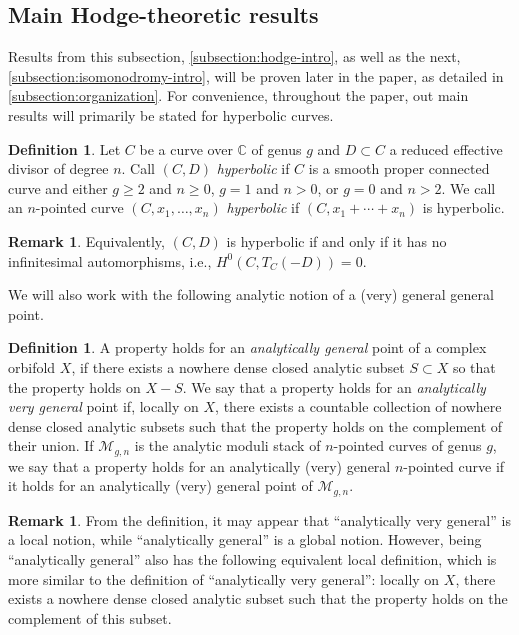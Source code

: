 \documentclass[12 pt]{amsart}
\theoremstyle{plain}
\theoremstyle{definition}
\newtheorem{definition}[subsubsection]{Definition}
\newtheorem{remark}[subsubsection]{Remark}
\theoremstyle{remark}
\numberwithin{equation}{section}
\begin{document}
\subsection{Main Hodge-theoretic results}
\label{subsection:hodge-intro}
Results from this subsection, \autoref{subsection:hodge-intro}, as well as the
next, \autoref{subsection:isomonodromy-intro}, will be proven later in the
paper, as detailed in \autoref{subsection:organization}.
For convenience, throughout the paper, out main results will primarily be stated for hyperbolic curves.
\begin{definition}
	\label{definition:hyperbolic}
	Let $C$ be a curve over $\mathbb C$ of genus $g$ and $D \subset C$ a
	reduced effective divisor of degree $n$. 
	Call $(C, D)$ {\em hyperbolic} if $C$ is a smooth proper connected curve
	and
	either $g \geq 2$ and $n\geq 0$, $g = 1$ and $n > 0$, or $g =0$ and $n > 2$.
	We call an $n$-pointed curve $(C, x_1, \ldots, x_n)$ {\em hyperbolic} if
	$(C, x_1 +\cdots + x_n)$ is hyperbolic.
\end{definition}
\begin{remark}
	\label{remark:}
	Equivalently, $(C,D)$ is hyperbolic if and only if it has no infinitesimal automorphisms,
i.e., $H^0(C, T_C(-D)) = 0$.
\end{remark}

We will also work with the following analytic notion of a (very) general general point.

\begin{definition}
	\label{definition:general}
	A property holds for an {\em analytically general} point of a complex orbifold $X$, 
	if there exists a nowhere dense
	closed analytic subset $S \subset X$ so that the property holds
	on $X - S$.
	We say that a property holds for an
	{\em analytically very general} point if, locally on $X$, there exists a countable collection of nowhere dense closed analytic subsets such that the property holds on the complement of their union. If $\mathscr{M}_{g,n}$ is the analytic moduli stack of
$n$-pointed curves of genus $g$, we say that a property holds for an
analytically (very) general $n$-pointed curve if it holds for an analytically
(very) general point of $\mathscr{M}_{g,n}$.
\end{definition}
\begin{remark}\label{remark:}
	From the definition, it may appear that ``analytically very general'' is
	a local notion, while ``analytically general'' is a global notion.
	However, being ``analytically general'' also has the following
	equivalent local definition, which is more similar to the definition of
	``analytically very general'':
	locally on $X$, there exists a nowhere dense closed analytic subset such
	that the property holds on the complement of this subset.
\end{remark}
\end{document}
